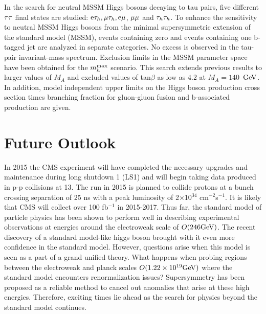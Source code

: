 In the search for neutral MSSM Higgs bosons decaying to tau pairs, five different $\mathrm{\tau}\mathrm{\tau}$ final states are studied: 
$\mathrm{e}\mathrm{\tau}_{h}, \mathrm{\mu}\mathrm{\tau}_{h}, \mathrm{e}\mathrm{\mu}$, $\mathrm{\mu}\mathrm{\mu}$ and $\mathrm{\tau}_{h}\mathrm{\tau}_{h}$. 
To enhance the sensitivity to neutral MSSM Higgs bosons 
from the minimal supersymmetric extension of the standard model (MSSM), 
events containing zero and events containing one b-tagged jet are analyzed in separate categories.
No excess is observed in the tau-pair invariant-mass spectrum. 
Exclusion limits in the MSSM parameter space have been obtained 
for the $m_h^{\rm max}$ scenario\cite{Heinemeyer:1998yj,Heinemeyer:1998np,Degrassi:2002fi}. 
This search extends previous 
results to larger values of $M_A$ and excluded values of tan$\beta$ 
as low as $4.2$ at $M_A=140$~$\mathrm{GeV}$. 
In addition, model independent upper limits on the Higgs boson production cross 
section times branching fraction for gluon-gluon fusion and b-associated 
production are given.

\section{Future Outlook}
In 2015 the CMS experiment will have completed the necessary upgrades and 
 maintenance during long shutdown 1 (LS1) and 
will begin taking data produced in p-p collisions at 13\TeV. The run 
in 2015 is planned to collide protons at a bunch crossing separation of 25 ns 
with a peak luminosity of 2$\times$10$^{34}$ cm$^{-2}$s$^{-1}$. 
 It is likely that CMS will collect over 100 fb$^{-1}$ in 2015-2017. 
 Thus far, the standard model of particle physics has been
 shown to perform well in describing experimental observations at energies around
 the electroweak scale of $O(246 \mathrm{GeV})$.
 The recent discovery of a standard model-like higgs boson brought with it
 even more confidence in the standard model. However, questions arise when this model is seen as 
 a part of a grand unified theory. What happens when probing
 regions between the electroweak and planck scales $O(1.22 \times10^{19} \mathrm{GeV})$ where
 the standard model encounters renormalization issues? 
 Supersymmetry has been proposed as a reliable method to 
 cancel out anomalies that arise at these high energies. 
 Therefore, exciting times lie ahead as the search for physics beyond the standard model 
 continues.  